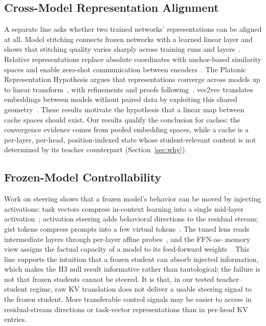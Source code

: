 \documentclass{article} %
\begin{document}
\subsection{Cross-Model Representation Alignment}
A separate line asks whether two trained networks' representations can be
aligned at all. Model stitching connects frozen networks with a learned
linear layer and shows that stitching quality varies sharply across training
runs and layers~\citep{stitching2021}. Relative representations replace
absolute coordinates with anchor-based similarity spaces and enable zero-shot
communication between encoders~\citep{relrep2022}. The Platonic Representation
Hypothesis argues that representations converge across models up to linear
transform~\citep{platonic2024}, with refinements and proofs
following~\citep{aristotelian2026,perfectplatonic2025}. vec2vec translates
embeddings between models without paired data by exploiting this shared
geometry~\citep{vec2vec2025}. These results motivate the hypothesis that a
linear map between cache spaces should exist. Our results qualify the
conclusion for caches: the convergence evidence comes from pooled embedding
spaces, while a cache is a per-layer, per-head, position-indexed state whose
student-relevant content is not determined by its teacher counterpart
(Section~\ref{sec:why}).

\subsection{Frozen-Model Controllability}
Work on steering shows that a frozen model's behavior can be moved by
injecting activations: task vectors compress in-context learning into a
single mid-layer activation~\citep{taskvectors2023}; activation steering adds
behavioral directions to the residual stream; gist tokens compress prompts
into a few virtual tokens~\citep{gist2023}. The tuned lens reads intermediate
layers through per-layer affine probes~\citep{tunedlens2023}, and the FFN-as-
memory view assigns the factual capacity of a model to its feed-forward
weights~\citep{ffnmemory2021}. This line supports the intuition that a frozen
student can absorb injected information, which makes the H3 null result
informative rather than tautological: the failure is not that frozen students
cannot be steered. It is that, in our tested teacher--student regime, raw KV
translation does not deliver a usable steering signal to the frozen student.
More transferable control signals may be easier to access in residual-stream
directions or task-vector representations than in per-head KV entries.
\end{document}
